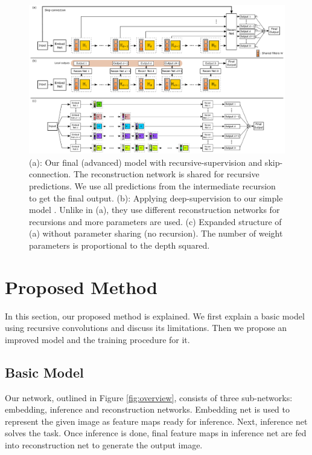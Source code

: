 \documentclass[10pt,twocolumn,letterpaper]{article}
\begin{document}
\begin{figure}[t]
\begin{center}
	\includegraphics[width=\textwidth]{figs/f3}
	\caption{(a): Our final (advanced) model with recursive-supervision and skip-connection. The reconstruction network is shared for recursive predictions. We use all predictions from the intermediate recursion to get the final output. (b): Applying deep-supervision to our simple model \cite{lee2014deeply}. Unlike in (a), they use different reconstruction networks for recursions and more parameters are used.  (c) Expanded structure of (a) without parameter sharing (no recursion). The number of weight parameters is proportional to the depth squared.  }
\label{fig:recursive_supervision}
\end{center}
\end{figure}

\section{Proposed Method}
In this section, our proposed method is explained. We first explain a basic model using recursive convolutions and discuss its limitations. Then we propose an improved model and the training procedure for it.

\subsection{Basic Model}

Our network, outlined in Figure \ref{fig:overview}, consists of three sub-networks: embedding, inference and reconstruction networks. Embedding net is used to represent the given image as feature maps ready for inference. Next, inference net solves the task. Once inference is done, final feature maps in inference net are fed into reconstruction net to generate the output image.
\end{document}
